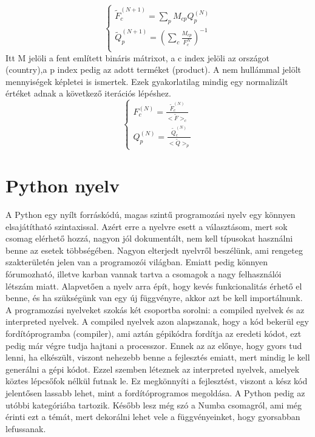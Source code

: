 \documentclass{article}
\theoremstyle{definition}
\theoremstyle{theorem}
\begin{document}
\begin{equation*}
    \begin{cases}
    \widetilde{F}_{c}^{(N + 1)} = \sum_{p} M_{cp} Q_{p}^{(N)} \\
    \widetilde{Q}_{p}^{(N+1)} = (\sum_{c} \frac{M_{cp}}{F_c^N})^{-1} \\

    \end{cases}
\end{equation*}
Itt M jelöli a fent említett bináris mátrixot, a c index jelöli az országot (country),a p index pedig az adott terméket (product). A nem hullámmal jelölt mennyiségek képletei is ismertek. Ezek gyakorlatilag mindig egy normalizált értéket adnak a következő iterációs lépéshez.
\begin{equation*}
    \begin{cases}
    F_c^{(N)} = \frac{\widetilde{F}_{c}^{(N)}}{<\widetilde{F}>_c} \\
    Q_p^{(N)} = \frac{\widetilde{Q}_{c}^{(N)}}{<\widetilde{Q}>_p}
    \end{cases}
\end{equation*}


\section{Python nyelv}

A Python egy nyílt forráskódú, magas szintű programozási nyelv egy könnyen elsajátítható szintaxissal. Azért erre a nyelvre esett
a választásom, mert sok csomag elérhető hozzá, nagyon jól dokumentált, nem kell típusokat használni benne az
esetek többségében. Nagyon elterjedt nyelvről beszélünk, ami rengeteg szakterületén jelen van a programozói világban. Emiatt pedig könnyen fórumozható, illetve karban vannak tartva a csomagok a nagy felhasználói létszám miatt. Alapvetően a nyelv arra épít, hogy kevés funkcionalitás érhető el benne, és ha szükségünk van egy új függvényre, akkor azt be kell importálnunk. A programozási nyelveket szokás két csoportba sorolni: a compiled nyelvek és az interpreted nyelvek. A compiled nyelvek azon alapszanak, hogy a kód bekerül egy fordítóprogramba (compiler), ami aztán gépikódra fordítja az eredeti kódot, ezt pedig már végre tudja hajtani a processzor. Ennek az az előnye, hogy gyors tud lenni, ha elkészült, viszont nehezebb benne a fejlesztés emiatt, mert mindig le kell generálni a gépi kódot. Ezzel szemben léteznek az interpreted nyelvek, amelyek köztes lépcsőfok nélkül futnak le. Ez megkönnyíti a fejlesztést, viszont a kész kód jelentősen lassabb lehet, mint a fordítóprogramos megoldása. A Python pedig az utóbbi kategóriába tartozik. Később lesz még szó a Numba csomagról, ami még érinti ezt a témát, mert dekorálni lehet vele a függvényeinket, hogy gyorsabban lefussanak.
\end{document}
